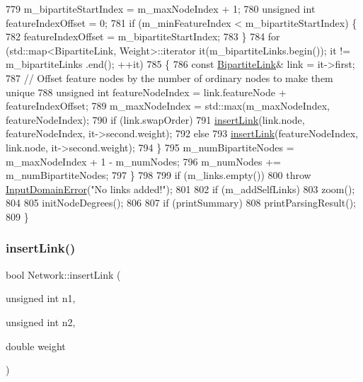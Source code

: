 \begin{DoxyCode}
779             m\_bipartiteStartIndex = m\_maxNodeIndex + 1;
780         \textcolor{keywordtype}{unsigned} \textcolor{keywordtype}{int} featureIndexOffset = 0;
781         \textcolor{keywordflow}{if} (m\_minFeatureIndex < m\_bipartiteStartIndex) \{
782             featureIndexOffset = m\_bipartiteStartIndex;
783         \}
784         \textcolor{keywordflow}{for} (std::map<BipartiteLink, Weight>::iterator it(m\_bipartiteLinks.begin()); it != m\_bipartiteLinks
      .end(); ++it)
785         \{
786             \textcolor{keyword}{const} \mbox{\hyperlink{structBipartiteLink}{BipartiteLink}}& link = it->first;
787             \textcolor{comment}{// Offset feature nodes by the number of ordinary nodes to make them unique}
788             \textcolor{keywordtype}{unsigned} \textcolor{keywordtype}{int} featureNodeIndex = link.featureNode + featureIndexOffset;
789             m\_maxNodeIndex = std::max(m\_maxNodeIndex, featureNodeIndex);
790             \textcolor{keywordflow}{if} (link.swapOrder)
791                 \mbox{\hyperlink{classNetwork_ace5fa3249715ed1b840fa733976aa57b}{insertLink}}(link.node, featureNodeIndex, it->second.weight);
792             \textcolor{keywordflow}{else}
793                 \mbox{\hyperlink{classNetwork_ace5fa3249715ed1b840fa733976aa57b}{insertLink}}(featureNodeIndex, link.node, it->second.weight);
794         \}
795         m\_numBipartiteNodes = m\_maxNodeIndex + 1 - m\_numNodes;
796         m\_numNodes += m\_numBipartiteNodes;
797     \}
798 
799     \textcolor{keywordflow}{if} (m\_links.empty())
800         \textcolor{keywordflow}{throw} \mbox{\hyperlink{classInputDomainError}{InputDomainError}}(\textcolor{stringliteral}{"No links added!"});
801 
802     \textcolor{keywordflow}{if} (m\_addSelfLinks)
803         zoom();
804 
805     initNodeDegrees();
806 
807     \textcolor{keywordflow}{if} (printSummary)
808         printParsingResult();
809 \}
\end{DoxyCode}
\mbox{\label{classNetwork_ace5fa3249715ed1b840fa733976aa57b}} 
\subsubsection{\texorpdfstring{insert\+Link()}{insertLink()}}
{\footnotesize\ttfamily bool Network\+::insert\+Link (\begin{DoxyParamCaption}\item[{unsigned int}]{n1,  }\item[{unsigned int}]{n2,  }\item[{double}]{weight }\end{DoxyParamCaption})\hspace{0.3cm}{\ttfamily [protected]}}


